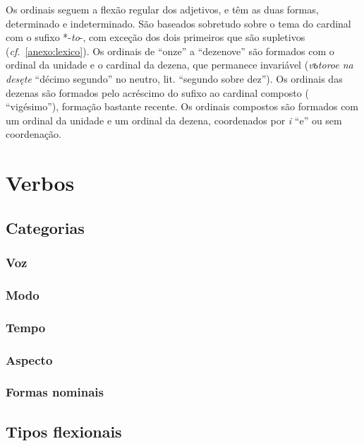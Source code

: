 Os ordinais seguem a flexão regular dos adjetivos, e têm as duas formas,
determinado e indeterminado. São baseados sobretudo sobre o tema do
cardinal com o sufixo *-\emph{to}-, com exceção dos dois primeiros que
são supletivos (\emph{cf.}~\autoref{anexo:lexico}). Os ordinais de ``onze'' a ``dezenove'' são
formados com o ordinal da unidade e o cardinal da dezena, que permanece
invariável (\emph{vъtoroe na desęte} ``décimo segundo'' no neutro, lit.
``segundo sobre dez''). Os ordinais das dezenas são formados pelo
acréscimo do sufixo ao cardinal composto (
``vigésimo''), formação bastante recente. Os ordinais compostos são
formados com um ordinal da unidade e um ordinal da dezena, coordenados
por \emph{i} ``e'' ou sem coordenação.

\section{Verbos}
\lipsum[20]

\subsection{Categorias}
\lipsum[19]

\subsubsection{Voz}
\lipsum[18]

\subsubsection{Modo}
\lipsum[17]

\subsubsection{Tempo}
\lipsum[16]

\subsubsection{Aspecto}
\lipsum[15]

\subsubsection{Formas nominais}
\lipsum[14]

\subsection{Tipos flexionais}\label{sec:tiposflexionais}
\lipsum[13]

